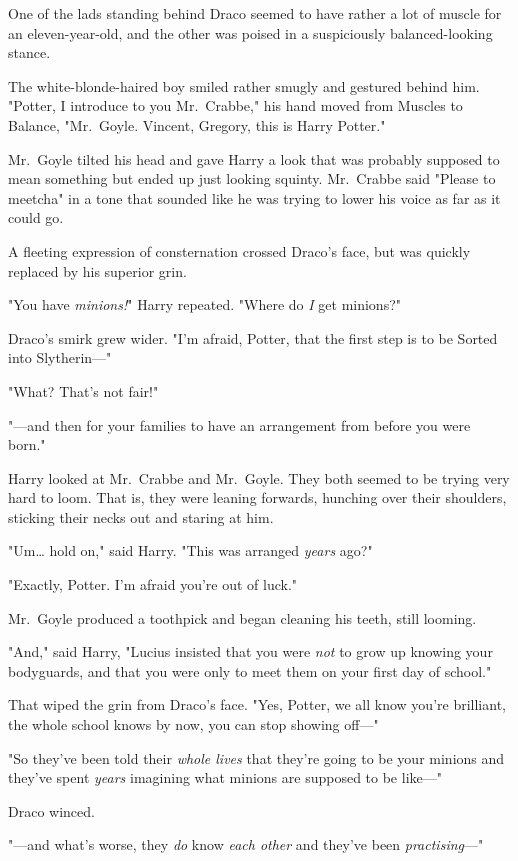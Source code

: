 One of the lads standing behind Draco seemed to have rather a lot of muscle for 
an eleven-year-old, and the other was poised in a suspiciously balanced-looking 
stance.

The white-blonde-haired boy smiled rather smugly and gestured behind him. 
"Potter, I introduce to you Mr.~Crabbe," his hand moved from Muscles to 
Balance, "Mr.~Goyle. Vincent, Gregory, this is Harry Potter."

Mr.~Goyle tilted his head and gave Harry a look that was probably supposed to 
mean something but ended up just looking squinty. Mr.~Crabbe said "Please to 
meetcha" in a tone that sounded like he was trying to lower his voice as far as 
it could go.

A fleeting expression of consternation crossed Draco's face, but was quickly 
replaced by his superior grin.

"You have \emph{minions!}" Harry repeated. "Where do \emph{I} get minions?"

Draco's smirk grew wider. "I'm afraid, Potter, that the first step is to be 
Sorted into Slytherin---"

"What? That's not fair!"

"---and then for your families to have an arrangement from before you were 
born."

Harry looked at Mr.~Crabbe and Mr.~Goyle. They both seemed to be trying very 
hard to loom. That is, they were leaning forwards, hunching over their 
shoulders, sticking their necks out and staring at him.

"Um{\ldots} hold on," said Harry. "This was arranged \emph{years} ago?"

"Exactly, Potter. I'm afraid you're out of luck."

Mr.~Goyle produced a toothpick and began cleaning his teeth, still looming.

"And," said Harry, "Lucius insisted that you were \emph{not} to grow up knowing 
your bodyguards, and that you were only to meet them on your first day of 
school."

That wiped the grin from Draco's face. "Yes, Potter, we all know you're 
brilliant, the whole school knows by now, you can stop showing off---"

"So they've been told their \emph{whole lives} that they're going to be your 
minions and they've spent \emph{years} imagining what minions are supposed to 
be like---"

Draco winced.

"---and what's worse, they \emph{do} know \emph{each other} and they've been 
\emph{practising}---"

